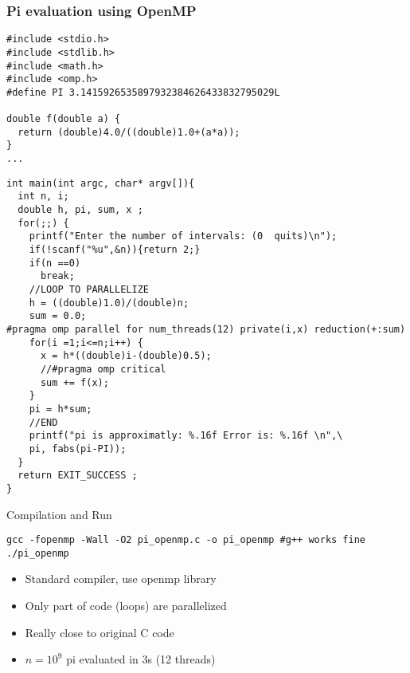 \documentclass[12pt]{beamer}
\begin{document}
\begin{frame}[fragile]
  \frametitle{Pi evaluation using OpenMP}
  \begin{verbatim}
#include <stdio.h>
#include <stdlib.h>
#include <math.h>
#include <omp.h>
#define PI 3.1415926535897932384626433832795029L

double f(double a) {
  return (double)4.0/((double)1.0+(a*a));
}
...
  \end{verbatim}
\end{frame}

\begin{frame}[fragile]
  \begin{verbatim}
int main(int argc, char* argv[]){
  int n, i;
  double h, pi, sum, x ;
  for(;;) {
    printf("Enter the number of intervals: (0  quits)\n");
    if(!scanf("%u",&n)){return 2;}
    if(n ==0)
      break;
    //LOOP TO PARALLELIZE
    h = ((double)1.0)/(double)n;
    sum = 0.0;
#pragma omp parallel for num_threads(12) private(i,x) reduction(+:sum)
    for(i =1;i<=n;i++) {
      x = h*((double)i-(double)0.5);
      //#pragma omp critical
      sum += f(x);
    }
    pi = h*sum;
    //END
    printf("pi is approximatly: %.16f Error is: %.16f \n",\
    pi, fabs(pi-PI));
  }
  return EXIT_SUCCESS ;
}
  \end{verbatim}
\end{frame}

\begin{frame}[fragile]
  \begin{block}{Compilation and Run}
    \begin{verbatim}
gcc -fopenmp -Wall -O2 pi_openmp.c -o pi_openmp #g++ works fine
./pi_openmp
    \end{verbatim}
  \end{block}
  \begin{block}{}
    \begin{itemize}[<+->]
    \item Standard compiler, use openmp library
    \item Only part of code (loops) are parallelized
    \item Really close to original C code
    \item $n = 10^9$ pi evaluated in 3s (12 threads)
    \end{itemize}
  \end{block}
\end{frame}
\end{document}
